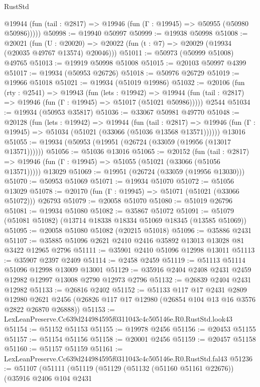 \begin{lexlean}{RustStd}
\begin{coremodule}
      @19944 (fun (tail : @2817) => @19946 (fun (Γ : @19945) => @50955 (@50980 @50986)))))
@50998 := @19940 @50997
@50999 := @19938 @50998
@51008 := @20021
    (fun (U : @20020) => @20022 (fun (t : @7) => @20029 (@19934 (@20035 @49767 @13574) @20046)))
@51011 := @50973 (@50999 @51008) @49765
@51013 := @19919 @50998 @51008
@51015 := @20103 @50997 @4399
@51017 := @19934 (@50953 @26726)
@51018 := @50976 @26729
@51019 := @19966 @51018
@51021 := @19934 (@51019 @19986)
@51032 := @20106
    (fun (rty : @2541) =>
    @19943
      (fun (lets : @19942) =>
      @19944 (fun (tail : @2817) => @19946 (fun (Γ : @19945) => @51017 (@51021 @50986)))))
    @2544
@51034 := @19934 (@50953 @35817)
@51036 := @33067 @50981 @49770
@51048 := @20128
    (fun (lets : @19942) =>
    @19944
      (fun (tail : @2817) =>
      @19946 (fun (Γ : @19945) => @51034 (@51021 (@33066 (@51036 @13568 @13571))))))
    @13016
@51055 := @19934 (@50953 (@19951 (@26724 (@33059 (@19956 (@13017 @13571))))))
@51056 := @51036 @13016
@51065 := @20152
    (fun (tail : @2817) => @19946 (fun (Γ : @19945) => @51055 (@51021 (@33066 (@51056 @13571)))))
    @13029
@51069 := @19951 (@26724 (@33059 (@19956 @13030)))
@51070 := @50953 @51069
@51071 := @19934 @51070
@51072 := @51056 @13029
@51078 := @20170 (fun (Γ : @19945) => @51071 (@51021 (@33066 @51072))) @26793
@51079 := @20058 @51070
@51080 := @51019 @26796
@51081 := @19934 @51080
@51082 := @35867 @51072
@51091 := @51079 (@51081 @51082) (@13714 @18338 @18334 @51069 @18345 (@13585 @51069))
@51095 := @20058 @51080 @51082 (@20215 @51018)
@51096 := @35886 @2431
@51107 := @35885 @51096 @2621 @2410 @2416 @35892 @13013 @13028 @81 @3422 @12965 @2796
@51111 := @35901 @2410 @51096 @12998 @13011
@51113 := @35907 @2397 @2409
@51114 := @2458 @2459
@51119 := @51113 @51114 @51096 @12998 @13009 @13001
@51129 := @35916 @2404 @2408 @2431 @2459 @12982 @12997 @13008 @2790 @12973 @2796
@51132 := @26839 @2404 @2431 @12982
@51133 := @26816 @2402
@51152 := @51133
    @117
    @17
    @2431
    @2809
    @12980
    @2621
    @2456
    (@26826 @117 @17 @12980 (@26854 @104 @13 @16 @3576 @2822 @26870 @26888))
@51153 := LexLeanPreserve.Cc639d244984595f0311043c4c505146e.R0.RustStd.look43
@51154 := @51152 @51153
@51155 := @19978 @2456
@51156 := @20453 @51155
@51157 := @51154 @51156
@51158 := @20001 @2456
@51159 := @20457 @51158
@51160 := @51157 @51159
@51161 := LexLeanPreserve.Cc639d244984595f0311043c4c505146e.R0.RustStd.fal43
@51236 := @51107
    (@51111
      (@51119
        (@51129
          (@51132 (@51160 @51161 @22676))
          (@35916
            @2406
            @104
            @2431

\end{coremodule}
\end{lexlean}
